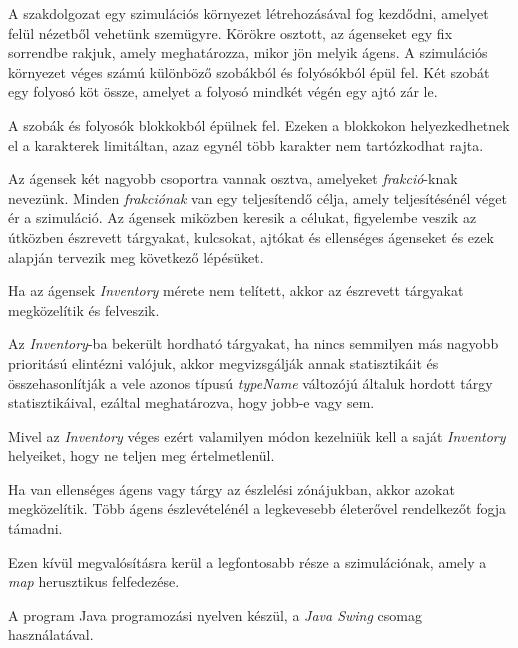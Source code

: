 
A szakdolgozat egy szimulációs környezet létrehozásával fog kezdődni, amelyet felül nézetből vehetünk szemügyre.
Körökre osztott, az ágenseket egy fix sorrendbe rakjuk, amely meghatározza, mikor jön melyik ágens.
A szimulációs környezet véges számú különböző szobákból és folyósókból épül fel. Két szobát egy folyosó köt össze, amelyet a folyosó mindkét végén egy ajtó zár le. 

A szobák és folyosók blokkokból épülnek fel. Ezeken a blokkokon helyezkedhetnek el a karakterek limitáltan, azaz egynél több karakter nem tartózkodhat rajta.

Az ágensek két nagyobb csoportra vannak osztva, amelyeket \textit{frakció}-knak nevezünk. Minden \textit{frakciónak} van egy teljesítendő célja, amely teljesítésénél véget ér a szimuláció.
Az ágensek miközben keresik a célukat, figyelembe veszik az útközben észrevett tárgyakat, kulcsokat, ajtókat és ellenséges ágenseket és ezek alapján tervezik meg következő lépésüket.

Ha az ágensek \textit{Inventory} mérete nem telített, akkor az észrevett tárgyakat megközelítik és felveszik.

Az \textit{Inventory}-ba bekerült hordható tárgyakat, ha nincs semmilyen más nagyobb prioritású elintézni valójuk, akkor megvizsgálják annak statisztikáit és összehasonlítják a vele azonos típusú \textit{typeName} változójú általuk hordott tárgy statisztikáival, ezáltal meghatározva, hogy jobb-e vagy sem.

Mivel az \textit{Inventory} véges ezért valamilyen módon kezelniük kell a saját \textit{Inventory} helyeiket, hogy ne teljen meg értelmetlenül.

Ha van ellenséges ágens vagy tárgy az észlelési zónájukban, akkor azokat megközelítik. Több ágens észlevételénél a legkevesebb életerővel  rendelkezőt fogja támadni.

Ezen kívül megvalósításra kerül a legfontosabb része a szimulációnak, amely a \textit{map} herusztikus felfedezése.

A program Java programozási nyelven \cite{arnold2005java} készül, a \textit{Java Swing} csomag \cite{10.5555/291162} használatával.